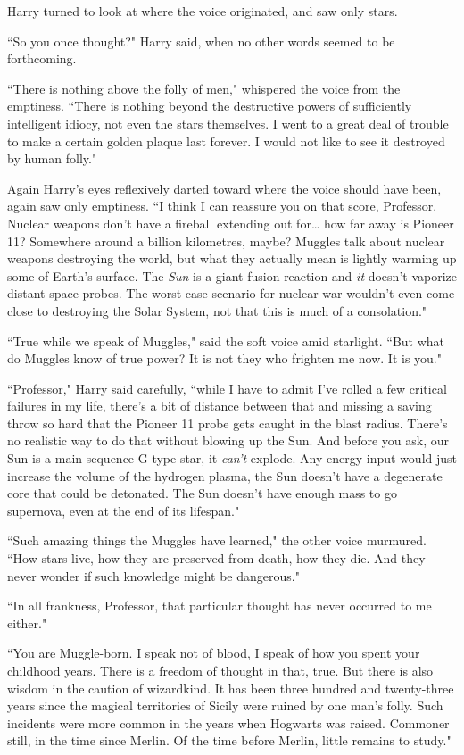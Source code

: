 Harry turned to look at where the voice originated, and saw only stars.

``So you once thought?" Harry said, when no other words seemed to be forthcoming.

``There is nothing above the folly of men," whispered the voice from the emptiness. ``There is nothing beyond the destructive powers of sufficiently intelligent idiocy, not even the stars themselves. I went to a great deal of trouble to make a certain golden plaque last forever. I would not like to see it destroyed by human folly."

Again Harry's eyes reflexively darted toward where the voice should have been, again saw only emptiness. ``I think I can reassure you on that score, Professor. Nuclear weapons don't have a fireball extending out for{\ldots} how far away is Pioneer 11? Somewhere around a billion kilometres, maybe? Muggles talk about nuclear weapons destroying the world, but what they actually mean is lightly warming up some of Earth's surface. The \emph{Sun} is a giant fusion reaction and \emph{it} doesn't vaporize distant space probes. The worst-case scenario for nuclear war wouldn't even come close to destroying the Solar System, not that this is much of a consolation."

``True while we speak of Muggles," said the soft voice amid starlight. ``But what do Muggles know of true power? It is not they who frighten me now. It is you."

``Professor," Harry said carefully, ``while I have to admit I've rolled a few critical failures in my life, there's a bit of distance between that and missing a saving throw so hard that the Pioneer 11 probe gets caught in the blast radius. There's no realistic way to do that without blowing up the Sun. And before you ask, our Sun is a main-sequence G-type star, it \emph{can't} explode. Any energy input would just increase the volume of the hydrogen plasma, the Sun doesn't have a degenerate core that could be detonated. The Sun doesn't have enough mass to go supernova, even at the end of its lifespan."

``Such amazing things the Muggles have learned," the other voice murmured. ``How stars live, how they are preserved from death, how they die. And they never wonder if such knowledge might be dangerous."

``In all frankness, Professor, that particular thought has never occurred to me either."

``You are Muggle-born. I speak not of blood, I speak of how you spent your childhood years. There is a freedom of thought in that, true. But there is also wisdom in the caution of wizardkind. It has been three hundred and twenty-three years since the magical territories of Sicily were ruined by one man's folly. Such incidents were more common in the years when Hogwarts was raised. Commoner still, in the time since Merlin. Of the time before Merlin, little remains to study."

